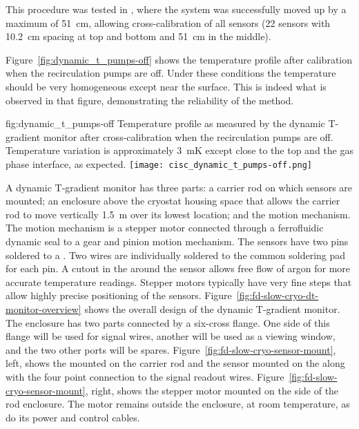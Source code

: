 This procedure was tested in , where the system was successfully moved up by a maximum of \SI{51}{cm}, allowing cross-calibration of all sensors (22 sensors with \SI{10.2}{cm} spacing at top and bottom and \SI{51}{cm} in the middle). 


Figure~\ref{fig:dynamic_t_pumps-off} shows the temperature profile after calibration when the recirculation pumps are off. Under these conditions the  temperature should be very homogeneous except near the surface. This is indeed what is observed in that figure, demonstrating the reliability of the method.  

\begin{dunefigure}{fig:dynamic_t_pumps-off}
  {Temperature profile as measured by the dynamic T-gradient monitor after cross-calibration when the recirculation pumps are off. Temperature variation is approximately \SI{3}{mK} except close to the top and the gas phase interface, as expected.}
  \texttt{[image: cisc\_dynamic\_t\_pumps-off.png]}%
\end{dunefigure}



A dynamic T-gradient monitor has three parts: a carrier rod on which sensors are mounted; an enclosure above the cryostat housing space that allows the carrier rod to move vertically  \SI{1.5}{m} over its lowest location; and the motion mechanism. The motion mechanism is a stepper motor connected through a ferrofluidic dynamic seal to a gear and pinion motion mechanism. The sensors have two pins soldered to a . 
Two wires are individually soldered to the common soldering pad for each pin.  A cutout in the  around the sensor allows free flow of argon for more accurate temperature readings.  Stepper motors typically have very fine steps that allow highly precise positioning of the sensors.  Figure~\ref{fig:fd-slow-cryo-dt-monitor-overview} shows the overall design of the dynamic T-gradient monitor. %
The enclosure has two parts connected by a six-cross flange. One side of this flange will be used for signal wires, another will be used as a viewing window, and the two other ports will be spares. Figure~\ref{fig:fd-slow-cryo-sensor-mount}, left, shows the  mounted on the carrier rod and the sensor mounted on the  along with the four point connection to the signal readout wires. %
Figure~\ref{fig:fd-slow-cryo-sensor-mount}, right, shows the stepper motor mounted on the side of the rod enclosure. The motor remains outside the enclosure, at room temperature, %
as do its power and control cables. %

